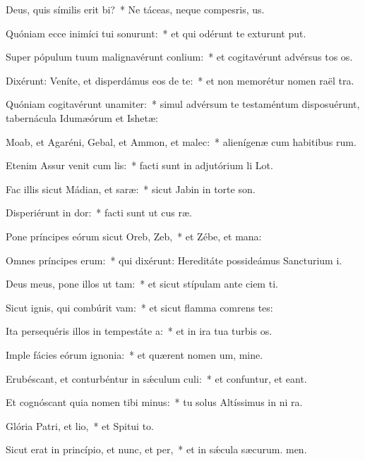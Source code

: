 \item Deus, quis símilis erit bi?~* Ne táceas, neque compesris, us.
\item Quóniam ecce inimíci tui sonurunt:~* et qui odérunt te exturunt put.
\item Super pópulum tuum malignavérunt conlium:~* et cogitavérunt advérsus tos os.
\item Dixérunt: Veníte, et disperdámus eos de te:~* et non memorétur nomen raël tra.
\item Quóniam cogitavérunt unamiter:~* simul advérsum te testaméntum disposuérunt, tabernácula Idumæórum et Ishetæ:
\item Moab, et Agaréni, Gebal, et Ammon, et malec:~* alienígenæ cum habitibus rum.
\item Etenim Assur venit cum lis:~* facti sunt in adjutórium li Lot.
\item Fac illis sicut Mádian, et saræ:~* sicut Jabin in torte son.
\item Disperiérunt in dor:~* facti sunt ut cus ræ.
\item Pone príncipes eórum sicut Oreb,  Zeb,~* et Zébe, et mana:
\item Omnes príncipes erum:~* qui dixérunt: Hereditáte possideámus Sancturium i.
\item Deus meus, pone illos ut tam:~* et sicut stípulam ante ciem ti.
\item Sicut ignis, qui combúrit vam:~* et sicut flamma comrens tes:
\item Ita persequéris illos in tempestáte a:~* et in ira tua turbis os.
\item Imple fácies eórum ignonia:~* et quærent nomen um, mine.
\item Erubéscant, et conturbéntur in sǽculum culi:~* et confuntur, et eant.
\item Et cognóscant quia nomen tibi minus:~* tu solus Altíssimus in ni ra.
\item Glória Patri, et lio,~* et Spitui to.
\item Sicut erat in princípio, et nunc, et per,~* et in sǽcula sæcurum. men.
